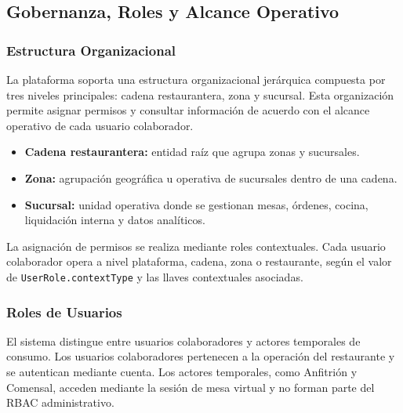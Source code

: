\subsection{Gobernanza, Roles y Alcance Operativo}

\subsubsection{Estructura Organizacional}

La plataforma soporta una estructura organizacional jerárquica compuesta por tres
niveles principales: cadena restaurantera, zona y sucursal. Esta organización permite
asignar permisos y consultar información de acuerdo con el alcance operativo de cada
usuario colaborador.

\begin{itemize}[leftmargin=1.5em]
  \item \textbf{Cadena restaurantera:} entidad raíz que agrupa zonas y sucursales.
  \item \textbf{Zona:} agrupación geográfica u operativa de sucursales dentro de una
  cadena.
  \item \textbf{Sucursal:} unidad operativa donde se gestionan mesas, órdenes, cocina,
  liquidación interna y datos analíticos.
\end{itemize}

La asignación de permisos se realiza mediante roles contextuales. Cada usuario colaborador
opera a nivel plataforma, cadena, zona o restaurante, según el valor de
\texttt{UserRole.contextType} y las llaves contextuales asociadas.

\subsubsection{Roles de Usuarios}

El sistema distingue entre usuarios colaboradores y actores temporales de consumo. Los
usuarios colaboradores pertenecen a la operación del restaurante y se autentican mediante
cuenta. Los actores temporales, como Anfitrión y Comensal, acceden mediante la sesión de
mesa virtual y no forman parte del RBAC administrativo.

